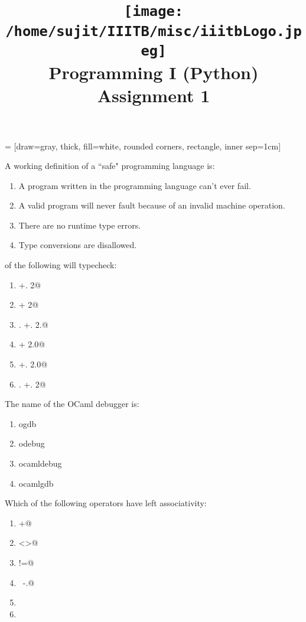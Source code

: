 \documentclass[addpoints,11pt]{exam}
\author{}
\title{\texttt{[image: /home/sujit/IIITB/misc/iiitbLogo.jpeg]} \\ Programming I (Python) \\ Assignment 1}
\date{}
\begin{document}
   = [draw=gray, thick, fill=white, rounded corners, rectangle, inner sep=1cm]
\maketitle


\thispagestyle{head}
\begin{questions}
\question A working definition of a ``safe" programming language is:
\begin{enumerate}
\item A program written in the programming language can't ever fail.
\item A valid program will never fault because of an invalid machine operation.
\item There are no runtime type errors.
\item Type conversions are disallowed.
\end{enumerate}\question of the following will typecheck:
\begin{enumerate}
\item {} +. 2@
\item {} + 2@
\item {}. +. 2.@
\item {} + 2.0@
\item {} +. 2.0@
\item {}. +. 2@
\end{enumerate}\question The name of the OCaml debugger is:
\begin{enumerate}
\item ogdb
\item odebug
\item ocamldebug
\item ocamlgdb
\end{enumerate}\question Which of the following operators have left associativity:
\begin{enumerate}
\item \lstinline@+@
\item \lstinline@<>@
\item \lstinline@!=@
\item \lstinline@~-.@
\item \lstinline@mod@
\item \lstinline@lsr@

\end{enumerate}
\end{questions}
\end{document}
